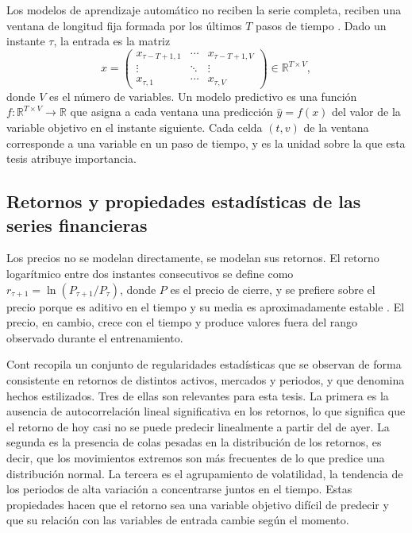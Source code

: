 Los modelos de aprendizaje automático no reciben la serie completa, reciben una ventana de longitud fija formada por los últimos $T$ pasos de tiempo \cite{lim2021}. Dado un instante $\tau$, la entrada es la matriz
\begin{equation}
    x = \begin{pmatrix} x_{\tau-T+1,1} & \cdots & x_{\tau-T+1,V} \\ \vdots & \ddots & \vdots \\ x_{\tau,1} & \cdots & x_{\tau,V} \end{pmatrix} \in \mathbb{R}^{T \times V},
    \label{eq:ventana}
\end{equation}
donde $V$ es el número de variables. Un modelo predictivo es una función $f\colon \mathbb{R}^{T \times V} \rightarrow \mathbb{R}$ que asigna a cada ventana una predicción $\hat{y} = f(x)$ del valor de la variable objetivo en el instante siguiente. Cada celda $(t,v)$ de la ventana corresponde a una variable en un paso de tiempo, y es la unidad sobre la que esta tesis atribuye importancia.

\subsection{Retornos y propiedades estadísticas de las series financieras}
\label{sec:mt_retornos}

Los precios no se modelan directamente, se modelan sus retornos. El retorno logarítmico entre dos instantes consecutivos se define como $r_{\tau+1} = \ln(P_{\tau+1}/P_{\tau})$, donde $P$ es el precio de cierre, y se prefiere sobre el precio porque es aditivo en el tiempo y su media es aproximadamente estable \cite{tsay2010}. El precio, en cambio, crece con el tiempo y produce valores fuera del rango observado durante el entrenamiento.

Cont \cite{cont2001} recopila un conjunto de regularidades estadísticas que se observan de forma consistente en retornos de distintos activos, mercados y periodos, y que denomina hechos estilizados. Tres de ellas son relevantes para esta tesis. La primera es la ausencia de autocorrelación lineal significativa en los retornos, lo que significa que el retorno de hoy casi no se puede predecir linealmente a partir del de ayer. La segunda es la presencia de colas pesadas en la distribución de los retornos, es decir, que los movimientos extremos son más frecuentes de lo que predice una distribución normal. La tercera es el agrupamiento de volatilidad, la tendencia de los periodos de alta variación a concentrarse juntos en el tiempo. Estas propiedades hacen que el retorno sea una variable objetivo difícil de predecir y que su relación con las variables de entrada cambie según el momento.

